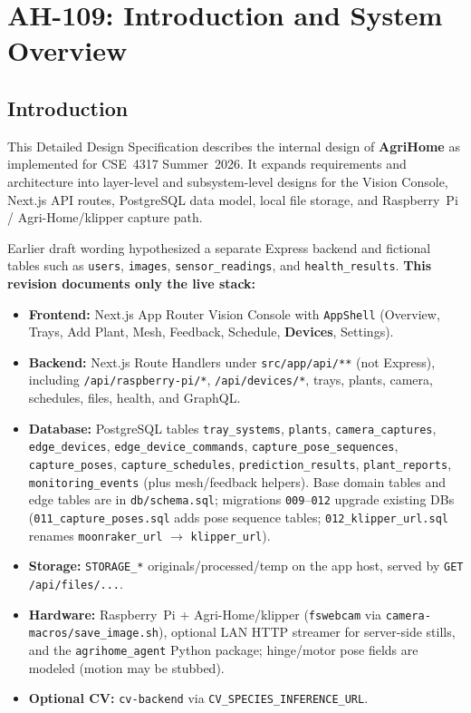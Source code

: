 \documentclass[11pt,letterpaper]{article}
\begin{document}
\section{AH-109: Introduction and System Overview}

\subsection{Introduction}
This Detailed Design Specification describes the internal design of \textbf{AgriHome} as
implemented for CSE~4317 Summer~2026. It expands requirements and architecture into
layer-level and subsystem-level designs for the Vision Console, Next.js API routes,
PostgreSQL data model, local file storage, and Raspberry~Pi / Agri-Home/klipper capture path.

Earlier draft wording hypothesized a separate Express backend and fictional tables such as
\texttt{users}, \texttt{images}, \texttt{sensor\_readings}, and \texttt{health\_results}.
\textbf{This revision documents only the live stack:}

\begin{itemize}
  \item \textbf{Frontend:} Next.js App Router Vision Console with \texttt{AppShell}
        (Overview, Trays, Add Plant, Mesh, Feedback, Schedule, \textbf{Devices}, Settings).
  \item \textbf{Backend:} Next.js Route Handlers under \texttt{src/app/api/**} (not Express),
        including \texttt{/api/raspberry-pi/*}, \texttt{/api/devices/*}, trays, plants, camera,
        schedules, files, health, and GraphQL.
  \item \textbf{Database:} PostgreSQL tables \texttt{tray\_systems}, \texttt{plants},
        \texttt{camera\_captures}, \texttt{edge\_devices}, \texttt{edge\_device\_commands},
        \texttt{capture\_pose\_sequences}, \texttt{capture\_poses}, \texttt{capture\_schedules},
        \texttt{prediction\_results}, \texttt{plant\_reports}, \texttt{monitoring\_events}
        (plus mesh/feedback helpers). Base domain tables and edge tables are in
        \texttt{db/schema.sql}; migrations \texttt{009}--\texttt{012} upgrade existing DBs
        (\texttt{011\_capture\_poses.sql} adds pose sequence tables;
        \texttt{012\_klipper\_url.sql} renames \texttt{moonraker\_url} $\rightarrow$ \texttt{klipper\_url}).
  \item \textbf{Storage:} \texttt{STORAGE\_*} originals/processed/temp on the app host,
        served by \texttt{GET /api/files/...}.
  \item \textbf{Hardware:} Raspberry~Pi + Agri-Home/klipper (\texttt{fswebcam} via
        \texttt{camera-macros/save\_image.sh}), optional LAN HTTP streamer for server-side stills,
        and the \texttt{agrihome\_agent} Python
        package; hinge/motor pose fields are modeled (motion may be stubbed).
  \item \textbf{Optional CV:} \texttt{cv-backend} via \texttt{CV\_SPECIES\_INFERENCE\_URL}.
\end{itemize}
\end{document}
